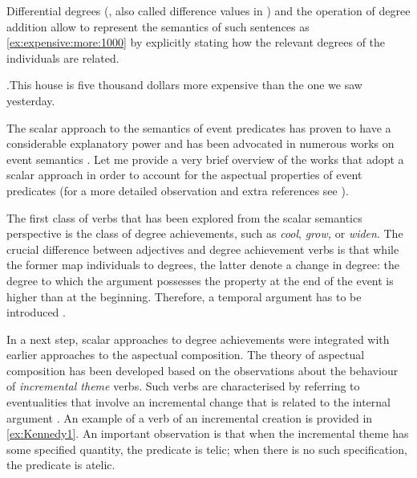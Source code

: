 Differential degrees (\citealt{Kennedy:01}, also called difference values in \citealt{KennedyLevin:02}) and the operation of degree addition \citep{KennedyLevin:02} allow to represent the semantics of such sentences as \ref{ex:expensive:more:1000} by explicitly stating how the relevant degrees of the individuals are related.
 
 \ex.\label{ex:expensive:more:1000}This house is five thousand dollars more expensive than the one we saw yesterday.

The scalar approach to the semantics of event predicates has proven to have a considerable explanatory power and has been advocated in numerous works on event semantics \citep[see, e.g.,][]{Ramchand:97, Hay:99, KennedyLevin:02, CaudalNicolas:05, FilipRothstein:05, Kearns:07, KennedyLevin:08, Filip:08, Pinon:08, Rappaport:08, Rappaport:11, McNally:11}. Let me provide a very brief overview of the works that adopt a scalar approach in order to account for the aspectual properties of event predicates (for a more detailed observation and extra references see \citealt{Arsenijevic:13}).

The first class of verbs that has been explored from the scalar semantics perspective is the class of degree achievements, such as \textit{cool}, \textit{grow,} or \textit{widen}. The crucial difference between adjectives and degree achievement verbs is that while the former map individuals to degrees, the latter denote a change in degree: the degree to which the argument possesses the property at the end of the event is higher than at the beginning. Therefore, a temporal argument has to be introduced \citep{Hay:99, KennedyLevin:02}.


In a next step, scalar approaches to degree achievements were integrated with earlier approaches to the aspectual composition. The theory of aspectual composition has been developed based on the observations about the behaviour of \textit{incremental theme} verbs. Such verbs are characterised by referring to eventualities that involve an incremental change that is related to the internal argument \citep[see][]{Garey:57, Wierzbicka:67, Verkuyl:72, Krifka:86, Krifka:92, Filip:92, Filip:99}. An example of a verb of an incremental creation is provided in \ref{ex:Kennedy1}. An important observation is that when the incremental theme has some specified quantity, the predicate is telic; when there is no such specification, the predicate is atelic.

